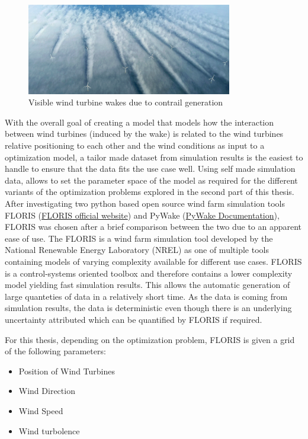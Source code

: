 \begin{figure}[h] 
	\centering
	\includegraphics[width=0.8\textwidth]{figures/introduction/wake_photo.png} 
	\caption{Visible wind turbine wakes due to contrail generation \cite{windpowermonthly_offshore_clusters}}
	\label{fig:wake_photo}
\end{figure}


With the overall goal of creating a model that models how the interaction between wind turbines (induced by the wake) is related to the wind turbines relative positioning to each other and the wind conditions as input to a optimization model, a tailor made dataset from simulation results is the easiest to handle to ensure that the data fits the use case well. Using self made simulation data, allows to set the parameter space of the model as required for the different variants of the optimization problems explored in the second part of this thesis. After investigating two python based open source wind farm simulation tools FLORIS (\href{https://www.nrel.gov/wind/floris}{FLORIS official website}) and PyWake (\href{https://topfarm.pages.windenergy.dtu.dk/PyWake/}{PyWake Documentation}), FLORIS was chosen after a brief comparison between the two due to an apparent ease of use. The FLORIS is a wind farm simulation tool developed by the National Renewable Energy Laboratory (NREL) as one of multiple tools containing models of varying complexity available for different use cases. FLORIS is a control-systems oriented toolbox and therefore contains a lower complexity model yielding fast simulation results. This allows the automatic generation of large quanteties of data in a relatively short time. As the data is coming from  simulation results, the data is deterministic even though there is an underlying uncertainty attributed which can be quantified by FLORIS if required. 

For this thesis, depending on the optimization problem, FLORIS is given a grid of the following parameters:

\begin{itemize}
	\item Position of Wind Turbines
	\item Wind Direction
	\item Wind Speed
	\item Wind turbolence
\end{itemize}

